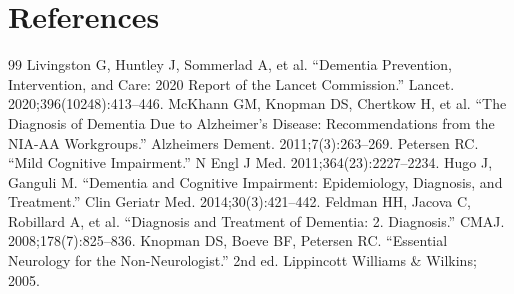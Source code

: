\section*{References}
\begin{thebibliography}{99}
 Livingston G, Huntley J, Sommerlad A, et al. ``Dementia Prevention, Intervention, and Care: 2020 Report of the Lancet Commission.'' Lancet. 2020;396(10248):413--446.
 McKhann GM, Knopman DS, Chertkow H, et al. ``The Diagnosis of Dementia Due to Alzheimer's Disease: Recommendations from the NIA-AA Workgroups.'' Alzheimers Dement. 2011;7(3):263--269.
 Petersen RC. ``Mild Cognitive Impairment.'' N Engl J Med. 2011;364(23):2227--2234.
 Hugo J, Ganguli M. ``Dementia and Cognitive Impairment: Epidemiology, Diagnosis, and Treatment.'' Clin Geriatr Med. 2014;30(3):421--442.
 Feldman HH, Jacova C, Robillard A, et al. ``Diagnosis and Treatment of Dementia: 2. Diagnosis.'' CMAJ. 2008;178(7):825--836.
 Knopman DS, Boeve BF, Petersen RC. ``Essential Neurology for the Non-Neurologist.'' 2nd ed. Lippincott Williams \& Wilkins; 2005.
\end{thebibliography}
